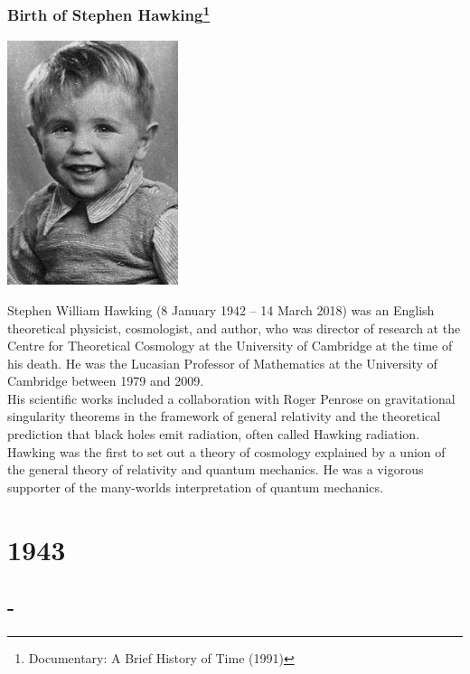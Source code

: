 \documentclass[11pt]{report}
\begin{document}
\subsection{Birth of Stephen Hawking\protect\footnote{Documentary: A Brief History of Time (1991)}}
\vspace{2mm}\begin{center}\includegraphics[width=5cm]{./img/youngHawking.jpg}\end{center}
Stephen William Hawking (8 January 1942 – 14 March 2018) was an English theoretical physicist, cosmologist, and author, who was director of research at the Centre for Theoretical Cosmology at the University of Cambridge at the time of his death. He was the Lucasian Professor of Mathematics at the University of Cambridge between 1979 and 2009.\\
His scientific works included a collaboration with Roger Penrose on gravitational singularity theorems in the framework of general relativity and the theoretical prediction that black holes emit radiation, often called Hawking radiation. Hawking was the first to set out a theory of cosmology explained by a union of the general theory of relativity and quantum mechanics. He was a vigorous supporter of the many-worlds interpretation of quantum mechanics.

\chapter{1943}
\section{-}
\end{document}
